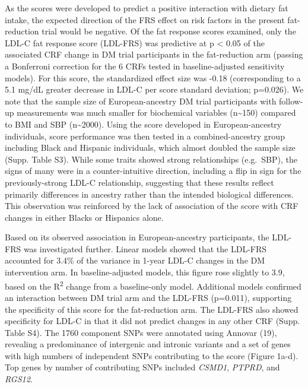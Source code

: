 \documentclass[]{article}
\begin{document}
As the scores were developed to predict a positive interaction with
dietary fat intake, the expected direction of the FRS effect on risk
factors in the present fat-reduction trial would be negative. Of the fat
response scores examined, only the LDL-C fat response score (LDL-FRS)
was predictive at p \textless{} 0.05 of the associated CRF change in DM
trial participants in the fat-reduction arm (passing a Bonferroni
correction for the 6 CRFs tested in baseline-adjusted sensitivity
models). For this score, the standardized effect size was -0.18
(corresponding to a 5.1 mg/dL greater decrease in LDL-C per score
standard deviation; p=0.026). We note that the sample size of
European-ancestry DM trial participants with follow-up measurements was
much smaller for biochemical variables (n\textasciitilde{}150) compared
to BMI and SBP (n\textasciitilde{}2000). Using the score developed in
European-ancestry individuals, score performance was then tested in a
combined-ancestry group including Black and Hispanic individuals, which
almost doubled the sample size (Supp. Table S3). While some traits
showed strong relationships (e.g.~SBP), the signs of many were in a
counter-intuitive direction, including a flip in sign for the
previously-strong LDL-C relationship, suggesting that these results
reflect primarily differences in ancestry rather than the intended
biological differences. This observation was reinforced by the lack of
association of the score with CRF changes in either Blacks or Hispanics
alone.

Based on its observed association in European-ancestry participants, the
LDL-FRS was investigated further. Linear models showed that the LDL-FRS
accounted for 3.4\% of the variance in 1-year LDL-C changes in the DM
intervention arm. In baseline-adjusted models, this figure rose slightly
to 3.9, based on the R\textsuperscript{2} change from a baseline-only
model. Additional models confirmed an interaction between DM trial arm
and the LDL-FRS (p=0.011), supporting the specificity of this score for
the fat-reduction arm. The LDL-FRS also showed specificity for LDL-C in
that it did not predict changes in any other CRF (Supp. Table S4). The
1760 component SNPs were annotated using Annovar (19), revealing a
predominance of intergenic and intronic variants and a set of genes with
high numbers of independent SNPs contributing to the score (Figure
1a-d). Top genes by number of contributing SNPs included \emph{CSMD1},
\emph{PTPRD}, and \emph{RGS12}.
\end{document}
